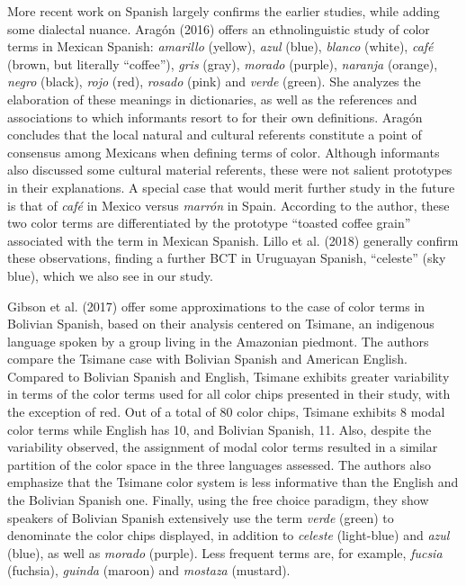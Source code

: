 \documentclass[
  english,
  ,man,floatsintext]{apa6}
\begin{document}
More recent work on Spanish largely confirms the earlier studies, while adding some dialectal nuance. Aragón (2016) offers an ethnolinguistic study of color terms in Mexican Spanish: \emph{amarillo} (yellow), \emph{azul} (blue), \emph{blanco} (white), \emph{café} (brown, but literally \enquote{coffee}), \emph{gris} (gray), \emph{morado} (purple), \emph{naranja} (orange), \emph{negro} (black), \emph{rojo} (red), \emph{rosado} (pink) and \emph{verde} (green). She analyzes the elaboration of these meanings in dictionaries, as well as the references and associations to which informants resort to for their own definitions. Aragón concludes that the local natural and cultural referents constitute a point of consensus among Mexicans when defining terms of color. Although informants also discussed some cultural material referents, these were not salient prototypes in their explanations. A special case that would merit further study in the future is that of \emph{café} in Mexico versus \emph{marrón} in Spain. According to the author, these two color terms are differentiated by the prototype \enquote{toasted coffee grain} associated with the term in Mexican Spanish. Lillo et al. (2018) generally confirm these observations, finding a further BCT in Uruguayan Spanish, \enquote{celeste} (sky blue), which we also see in our study.

Gibson et al. (2017) offer some approximations to the case of color terms in Bolivian Spanish, based on their analysis centered on Tsimane, an indigenous language spoken by a group living in the Amazonian piedmont. The authors compare the Tsimane case with Bolivian Spanish and American English. Compared to Bolivian Spanish and English, Tsimane exhibits greater variability in terms of the color terms used for all color chips presented in their study, with the exception of red. Out of a total of 80 color chips, Tsimane exhibits 8 modal color terms while English has 10, and Bolivian Spanish, 11. Also, despite the variability observed, the assignment of modal color terms resulted in a similar partition of the color space in the three languages assessed. The authors also emphasize that the Tsimane color system is less informative than the English and the Bolivian Spanish one. Finally, using the free choice paradigm, they show speakers of Bolivian Spanish extensively use the term \emph{verde} (green) to denominate the color chips displayed, in addition to \emph{celeste} (light-blue) and \emph{azul} (blue), as well as \emph{morado} (purple). Less frequent terms are, for example, \emph{fucsia} (fuchsia), \emph{guinda} (maroon) and \emph{mostaza} (mustard).
\end{document}
